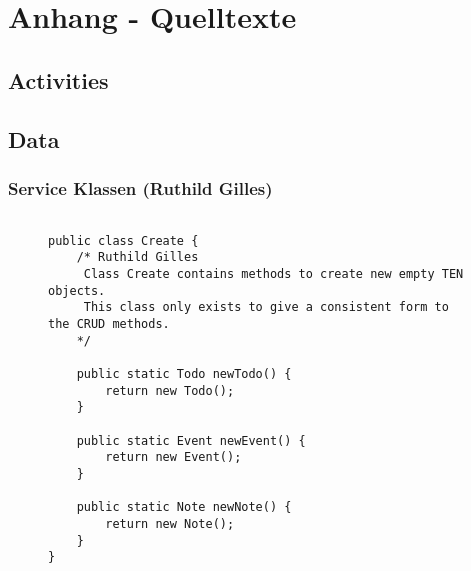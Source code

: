 \section{Anhang - Quelltexte}
\label{instal}

\subsection{Activities}

\subsection{Data}
\subsubsection{Service Klassen (Ruthild Gilles)}
\begin{figure}[H]
\begin{lstlisting}[caption=Create Klasse (Ruthild Gilles)]

public class Create {
    /* Ruthild Gilles
     Class Create contains methods to create new empty TEN objects.
     This class only exists to give a consistent form to the CRUD methods.
    */

    public static Todo newTodo() {
        return new Todo();
    }

    public static Event newEvent() {
        return new Event();
    }

    public static Note newNote() {
        return new Note();
    }
}
\end{lstlisting}
\end{figure}


